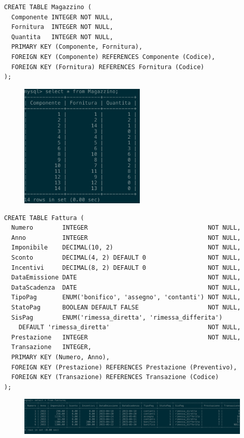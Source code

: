     \begin{lstlisting}
CREATE TABLE Magazzino (
  Componente INTEGER NOT NULL,
  Fornitura  INTEGER NOT NULL,
  Quantita   INTEGER NOT NULL,
  PRIMARY KEY (Componente, Fornitura),
  FOREIGN KEY (Componente) REFERENCES Componente (Codice),
  FOREIGN KEY (Fornitura) REFERENCES Fornitura (Codice)
);
    \end{lstlisting}
    \begin{figure}[H]
      \centering
      \includegraphics[width=6cm]{images/screenshots/schema/magazzino.png}
    \end{figure}

    \begin{lstlisting}
CREATE TABLE Fattura (
  Numero        INTEGER                                 NOT NULL,
  Anno          INTEGER                                 NOT NULL,
  Imponibile    DECIMAL(10, 2)                          NOT NULL,
  Sconto        DECIMAL(4, 2) DEFAULT 0                 NOT NULL,
  Incentivi     DECIMAL(8, 2) DEFAULT 0                 NOT NULL,
  DataEmissione DATE                                    NOT NULL,
  DataScadenza  DATE                                    NOT NULL,
  TipoPag       ENUM('bonifico', 'assegno', 'contanti') NOT NULL,
  StatoPag      BOOLEAN DEFAULT FALSE                   NOT NULL,
  SisPag        ENUM('rimessa_diretta', 'rimessa_differita')
    DEFAULT 'rimessa_diretta'                           NOT NULL,
  Prestazione   INTEGER                                 NOT NULL,
  Transazione   INTEGER,
  PRIMARY KEY (Numero, Anno),
  FOREIGN KEY (Prestazione) REFERENCES Prestazione (Preventivo),
  FOREIGN KEY (Transazione) REFERENCES Transazione (Codice)
);
    \end{lstlisting}
    \begin{figure}[H]
      \centering
      \includegraphics[width=15cm]{images/screenshots/schema/fattura.png}
    \end{figure}

